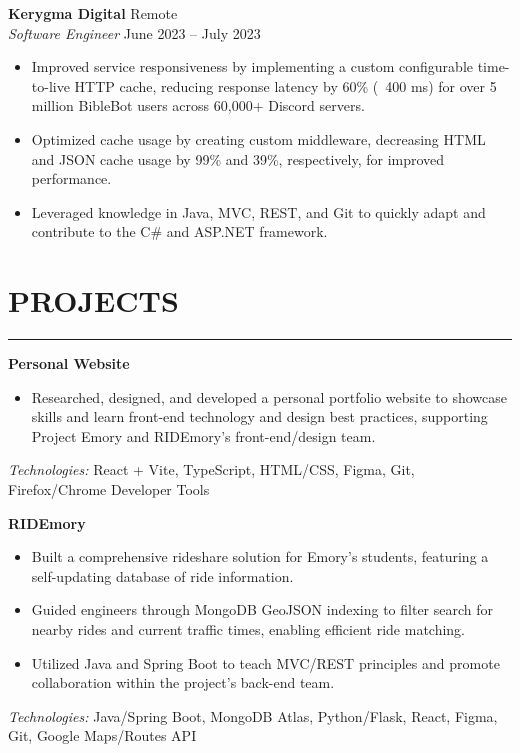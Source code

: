 \documentclass[10.5pt]{article}
\begin{document}
\noindent
\textbf{Kerygma Digital} \hfill {Remote}\\
\emph{Software Engineer} \hfill {June 2023} -- {July 2023}
\begin{itemize}
    \item Improved service responsiveness by implementing a custom configurable time-to-live HTTP cache, reducing response latency by 60\% (~400 ms) for over 5 million BibleBot users across 60,000+ Discord servers. \item Optimized cache usage by creating custom middleware, decreasing HTML and JSON cache usage by 99\% and 39\%, respectively, for improved performance. \item Leveraged knowledge in Java, MVC, REST, and Git to quickly adapt and contribute to the C\# and ASP.NET framework.
\end{itemize}

 \vspace{-\baselineskip}\section*{\large\textbf{PROJECTS}}
\vspace{-\baselineskip}
\noindent\rule{\textwidth}{0.4pt}


\noindent
\textbf{Personal Website}
\begin{itemize}
    \item Researched, designed, and developed a personal portfolio website to showcase skills and learn front-end technology and design best practices, supporting Project Emory and RIDEmory's front-end/design team.
\end{itemize}
\emph{Technologies:} {React + Vite, TypeScript, HTML/CSS, Figma, Git, Firefox/Chrome Developer Tools}

\noindent
\textbf{RIDEmory}
\begin{itemize}
    \item Built a comprehensive rideshare solution for Emory's students, featuring a self-updating database of ride information. \item Guided engineers through MongoDB GeoJSON indexing to filter search for nearby rides and current traffic times, enabling efficient ride matching. \item Utilized Java and Spring Boot to teach MVC/REST principles and promote collaboration within the project's back-end team.
\end{itemize}
\emph{Technologies:} {Java/Spring Boot, MongoDB Atlas, Python/Flask, React, Figma, Git, Google Maps/Routes API}
\end{document}

